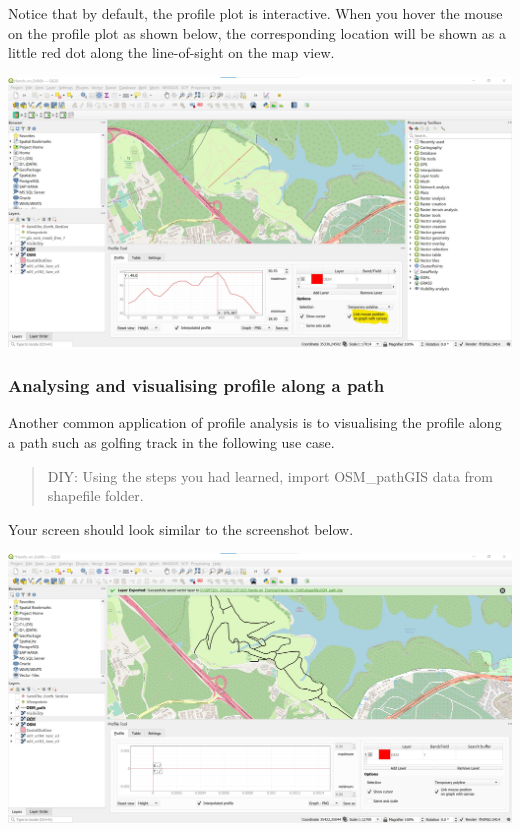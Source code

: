 \documentclass[
  letterpaper,
  DIV=11,
  numbers=noendperiod]{scrreprt}
\begin{document}
Notice that by default, the profile plot is interactive. When you hover
the mouse on the profile plot as shown below, the corresponding location
will be shown as a little red dot along the line-of-sight on the map
view.

\includegraphics{./img06/image76.jpg}

\hypertarget{analysing-and-visualising-profile-along-a-path}{%
\subsubsection{Analysing and visualising profile along a
path}\label{analysing-and-visualising-profile-along-a-path}}

Another common application of profile analysis is to visualising the
profile along a path such as golfing track in the following use case.

\begin{quote}
DIY: Using the steps you had learned, import OSM\_pathGIS data from
shapefile folder.
\end{quote}

Your screen should look similar to the screenshot below.

\includegraphics{./img06/image77.jpg}
\end{document}
